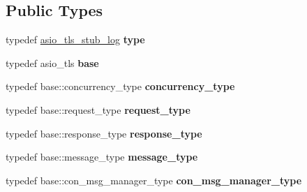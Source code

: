 \subsection*{Public Types}
\begin{DoxyCompactItemize}
\item 
\mbox{\label{structfc_1_1http_1_1detail_1_1asio__tls__stub__log_a00f74a98bb4a4f7d9e25699a13501703}} 
typedef \mbox{\hyperlink{structfc_1_1http_1_1detail_1_1asio__tls__stub__log}{asio\+\_\+tls\+\_\+stub\+\_\+log}} {\bfseries type}
\item 
\mbox{\label{structfc_1_1http_1_1detail_1_1asio__tls__stub__log_a5e4d189581e2c48bdd1670c1f46e0883}} 
typedef asio\+\_\+tls {\bfseries base}
\item 
\mbox{\label{structfc_1_1http_1_1detail_1_1asio__tls__stub__log_ab51f1d7050a591f36026da5976b5c4c1}} 
typedef base\+::concurrency\+\_\+type {\bfseries concurrency\+\_\+type}
\item 
\mbox{\label{structfc_1_1http_1_1detail_1_1asio__tls__stub__log_a1b8df3b3315192b90bfebb663d7c66d5}} 
typedef base\+::request\+\_\+type {\bfseries request\+\_\+type}
\item 
\mbox{\label{structfc_1_1http_1_1detail_1_1asio__tls__stub__log_a992e42d113382d3653cd3e273041ceba}} 
typedef base\+::response\+\_\+type {\bfseries response\+\_\+type}
\item 
\mbox{\label{structfc_1_1http_1_1detail_1_1asio__tls__stub__log_aa623222d46cb4e2bb1037727db5a5318}} 
typedef base\+::message\+\_\+type {\bfseries message\+\_\+type}
\item 
\mbox{\label{structfc_1_1http_1_1detail_1_1asio__tls__stub__log_a7ccce377d280f7434b9036b84e776c77}} 
typedef base\+::con\+\_\+msg\+\_\+manager\+\_\+type {\bfseries con\+\_\+msg\+\_\+manager\+\_\+type}
\item 
\mbox{\label{structfc_1_1http_1_1detail_1_1asio__tls__stub__log_a916f497d87ae6810d665c18a2d5bd57e}} 

\end{DoxyCompactItemize}
